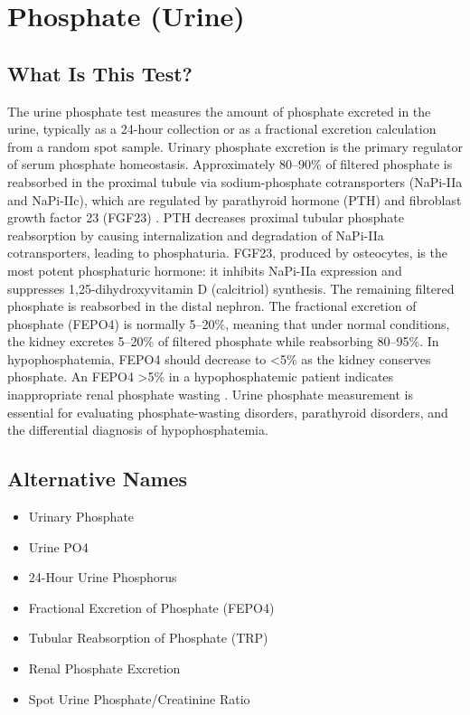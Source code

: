 \chapter{Phosphate (Urine)}

\section*{What Is This Test?}
The urine phosphate test measures the amount of phosphate excreted in the urine, typically as a 24-hour collection or as a fractional excretion calculation from a random spot sample. Urinary phosphate excretion is the primary regulator of serum phosphate homeostasis. Approximately 80--90\% of filtered phosphate is reabsorbed in the proximal tubule via sodium-phosphate cotransporters (NaPi-IIa and NaPi-IIc), which are regulated by parathyroid hormone (PTH) and fibroblast growth factor 23 (FGF23) \cite{bergwitz2010regulation}. PTH decreases proximal tubular phosphate reabsorption by causing internalization and degradation of NaPi-IIa cotransporters, leading to phosphaturia. FGF23, produced by osteocytes, is the most potent phosphaturic hormone: it inhibits NaPi-IIa expression and suppresses 1,25-dihydroxyvitamin D (calcitriol) synthesis. The remaining filtered phosphate is reabsorbed in the distal nephron. The fractional excretion of phosphate (FEPO4) is normally 5--20\%, meaning that under normal conditions, the kidney excretes 5--20\% of filtered phosphate while reabsorbing 80--95\%. In hypophosphatemia, FEPO4 should decrease to <5\% as the kidney conserves phosphate. An FEPO4 >5\% in a hypophosphatemic patient indicates inappropriate renal phosphate wasting \cite{wallach2022interpretation}. Urine phosphate measurement is essential for evaluating phosphate-wasting disorders, parathyroid disorders, and the differential diagnosis of hypophosphatemia.

\section*{Alternative Names}
\begin{itemize}
  \item Urinary Phosphate
  \item Urine PO4
  \item 24-Hour Urine Phosphorus
  \item Fractional Excretion of Phosphate (FEPO4)
  \item Tubular Reabsorption of Phosphate (TRP)
  \item Renal Phosphate Excretion
  \item Spot Urine Phosphate/Creatinine Ratio
\end{itemize}
